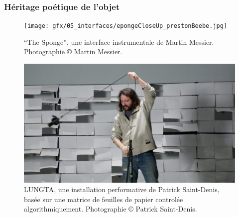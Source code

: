 \subsubsection{Héritage poétique de l'objet}
\begin{figure}[!htbp]
	\captionsetup{format=plain}%
	\centering
	\begin{minipage}[t]{0.48\textwidth}
		\texttt{[image: gfx/05\_interfaces/epongeCloseUp\_prestonBeebe.jpg]}
		\caption[``The Sponge'' de Martin Messier]{``The Sponge'', une interface instrumentale de Martin Messier. Photographie © Martin Messier.}
		\label{fig:interface:TheSponge}
	\end{minipage}
	\hspace{.02\linewidth}
	\begin{minipage}[t]{0.48\textwidth}
	    \includegraphics[width=\linewidth]{gfx/05_interfaces/Saint-Denis-Lungta.jpg}
		\caption[LUNGTA de Patrick Saint-Denis]{LUNGTA, une installation performative de Patrick Saint-Denis, basée sur une matrice de feuilles de papier controlée algorithmiquement. Photographie © Patrick Saint-Denis.}
		\label{fig:interface:lungta}
	\end{minipage}
\end{figure}

